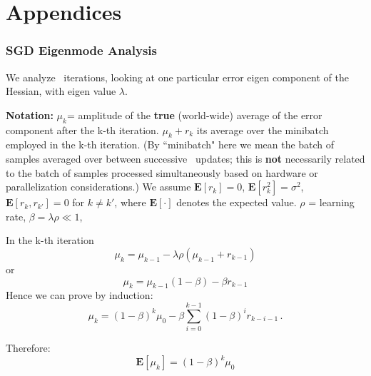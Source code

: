 \documentclass{article} %
\begin{document}

\newpage
\part{Appendices}

\appendix

\section{SGD Eigenmode Analysis}
\label{sec:sgd_eigenmode}
We analyze \SGD~iterations, looking at one particular error eigen component of the Hessian, with eigen value $\lambda$.

\textbf{Notation:} $\mu_k$= amplitude of the \textbf{true} (world-wide) average of the error component after the k-th iteration. $\mu_k + r_k$ its average over the minibatch employed in the k-th iteration. (By ``minibatch" here we mean the batch of samples averaged over between successive \SGD~updates; this is \textbf{not} necessarily related to the batch of samples processed simultaneously based on hardware or parallelization considerations.) We assume $\mathbf{E}[r_k]=0$, $\mathbf{E}[r_k^2]=\sigma^2$, $\mathbf{E}[r_k,r_{k'}]=0$ for $k \neq k'$, where $\mathbf E[\cdot]$ denotes the expected value.
$\rho$ = learning rate, $\beta=\lambda \rho \ll 1$, 

In the k-th iteration 
\begin{equation}
\mu_k = \mu_{k-1} - \lambda \rho (\mu_{k-1} + r_{k-1})
\label{eqn:muupdate}
\end{equation}
or
\begin{equation}
	\mu_k = \mu_{k-1} (1- \beta)  - \beta r_{k-1}
	\label{eqn:muupdate2}
\end{equation}
Hence we can prove by induction:
\begin{equation}
  \mu_k = (1-\beta)^k \mu_0 - \beta \sum_{i=0}^{k-1} (1-\beta)^i r_{k-i-1}\,.
\end{equation}

Therefore:
\begin{equation}
\mathbf E [\mu_k] = (1-\beta)^k \mu_0 
\end{equation}
\end{document}
